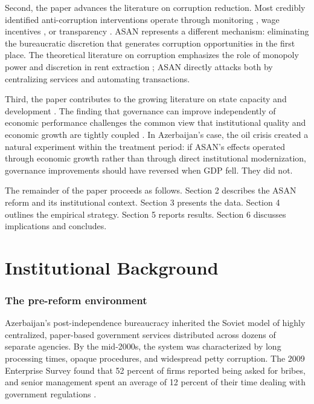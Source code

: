 \documentclass[12pt]{article}
\begin{document}
Second, the paper advances the literature on corruption reduction. Most credibly identified anti-corruption interventions operate through monitoring \citep{olken2007monitoring, ferraz2008exposing, ferraz2011electoral}, wage incentives \citep{ditella2003role}, or transparency \citep{reinikka2005fighting}. ASAN represents a different mechanism: eliminating the bureaucratic discretion that generates corruption opportunities in the first place. The theoretical literature on corruption emphasizes the role of monopoly power and discretion in rent extraction \citep{shleifer1993corruption, svensson2005eight}; ASAN directly attacks both by centralizing services and automating transactions.

Third, the paper contributes to the growing literature on state capacity and development \citep{muralidharan2016building, xu2018politics}. The finding that governance can improve independently of economic performance challenges the common view that institutional quality and economic growth are tightly coupled \citep{mauro1995corruption}. In Azerbaijan's case, the oil crisis created a natural experiment within the treatment period: if ASAN's effects operated through economic growth rather than through direct institutional modernization, governance improvements should have reversed when GDP fell. They did not.

The remainder of the paper proceeds as follows. Section 2 describes the ASAN reform and its institutional context. Section 3 presents the data. Section 4 outlines the empirical strategy. Section 5 reports results. Section 6 discusses implications and concludes.


\section{Institutional Background}

\subsubsection*{The pre-reform environment} Azerbaijan's post-independence bureaucracy inherited the Soviet model of highly centralized, paper-based government services distributed across dozens of separate agencies. By the mid-2000s, the system was characterized by long processing times, opaque procedures, and widespread petty corruption. The 2009 Enterprise Survey found that 52 percent of firms reported being asked for bribes, and senior management spent an average of 12 percent of their time dealing with government regulations \citep{worldbank2020beeps}.
\end{document}
